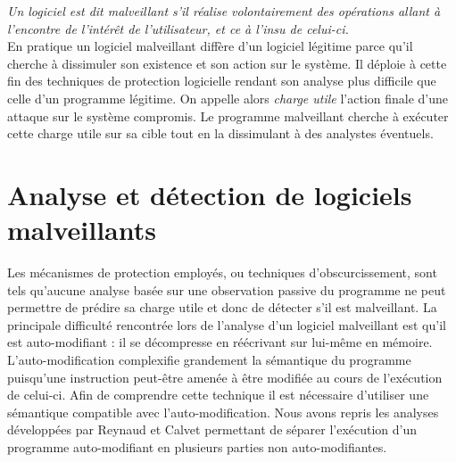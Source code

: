 \textit{Un logiciel est dit malveillant s'il réalise volontairement des opérations allant à l'encontre de l'intérêt de l'utilisateur, et ce à l'insu de celui-ci.}
\\ 



En pratique un logiciel malveillant diffère d'un logiciel légitime parce qu'il cherche à dissimuler son existence et son action sur le système. Il déploie à cette fin des techniques de protection logicielle rendant son analyse plus difficile que celle d'un programme légitime.
On appelle alors \emph{charge utile} l'action finale d'une attaque sur le système compromis.
Le programme malveillant cherche à exécuter cette charge utile sur sa cible tout en la dissimulant à des analystes éventuels.

\section*{Analyse et détection de logiciels malveillants}

Les mécanismes de protection employés, ou techniques d'obscurcissement, sont tels qu'aucune analyse basée sur une observation passive du programme ne peut permettre de prédire sa charge utile et donc de détecter s'il est malveillant.
La principale difficulté rencontrée lors de l'analyse d'un logiciel malveillant est qu'il est auto-modifiant : il se décompresse en réécrivant sur lui-même en mémoire. L'auto-modification complexifie grandement la sémantique du programme puisqu'une instruction peut-être amenée à être modifiée au cours de l'exécution de celui-ci.
Afin de comprendre cette technique il est nécessaire d'utiliser une sémantique compatible avec l'auto-modification.
Nous avons repris les analyses développées par Reynaud \cite{Reynaud2010} et Calvet \cite{Calvet2013} permettant de séparer l'exécution d'un programme auto-modifiant en plusieurs parties non auto-modifiantes. 

